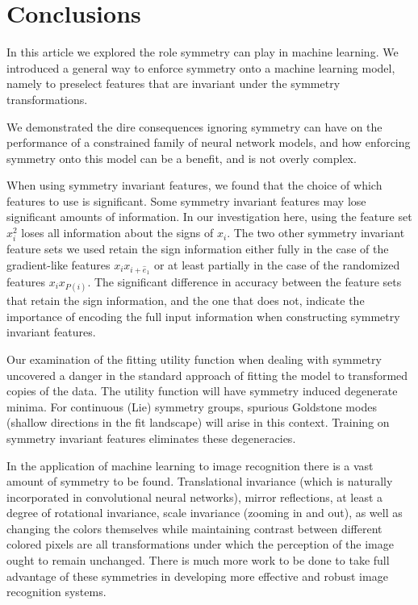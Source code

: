 \documentclass{svproc}
\begin{document}
\section{Conclusions}\label{Sec:conclusions}

In this article we explored the role symmetry can play in machine learning. We introduced a general way to enforce symmetry onto a machine learning model, namely to preselect features that are invariant under the symmetry transformations.

We demonstrated the dire consequences ignoring symmetry can have on the performance of a constrained family of neural network models, and how enforcing symmetry onto this model can be a benefit, and is not overly complex.

When using symmetry invariant features, we found that the choice of which features to use is significant. Some symmetry invariant features may lose significant amounts of information. In our investigation here, using the feature set $x_i^2$ loses all information about the signs of $x_i$. The two other symmetry invariant feature sets we used retain the sign information either fully in the case of the gradient-like features $x_i x_{i + {\hat e}_1}$ or at least partially in the case of the randomized features $x_i x_{P(i)}$. The significant difference in accuracy between the feature sets that retain the sign information, and the one that does not, indicate the importance of encoding the full input information when constructing symmetry invariant features.

Our examination of the fitting utility function when dealing with symmetry uncovered a danger in the standard approach of fitting the model to transformed copies of the data. The utility function will have symmetry induced degenerate minima. For continuous (Lie) symmetry groups, spurious Goldstone modes (shallow directions in the fit landscape) will arise in this context. Training on symmetry invariant features eliminates these degeneracies. 

In the application of machine learning to image recognition there is a vast amount of symmetry to be found. Translational invariance (which is naturally incorporated in convolutional neural networks), mirror reflections, at least a degree of rotational invariance, scale invariance (zooming in and out), as well as changing the colors themselves while maintaining contrast between different colored pixels are all transformations under which the perception of the image ought to remain unchanged. There is much more work to be done to take full advantage of these symmetries in developing more effective and robust image recognition systems.
\end{document}
